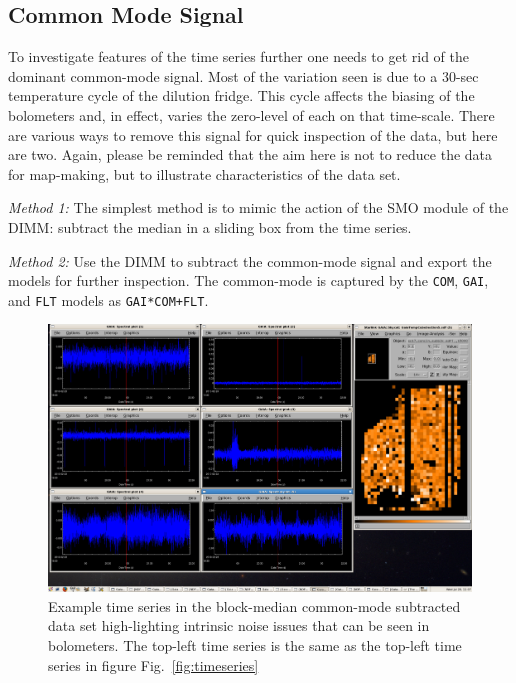 \documentclass[twoside,11pt]{article}
\newcommand{\xlabel}[1]{}
\renewcommand{\_}{\texttt{\symbol{95}}}
\begin{document}
\subsection{\xlabel{commonmode}Common Mode Signal}
\label{sec:commonmode}

To investigate features of the time series further one needs to get
rid of the dominant common-mode signal. Most of the variation seen is
due to a 30-sec temperature cycle of the dilution fridge. This cycle
affects the biasing of the bolometers and, in effect, varies the
zero-level of each on that time-scale. There are various ways to
remove this signal for quick inspection of the data, but here are two.
Again, please be reminded that the aim here is not to reduce the data
for map-making, but to illustrate characteristics of the data set.

\textsl{Method 1:} The simplest method is to mimic the action of the SMO module
of the DIMM: subtract the median in a sliding box from the time
series.

\textsl{Method 2:} Use the DIMM to subtract the common-mode signal and
export the models for further inspection. The common-mode is captured
by the \texttt{COM}, \texttt{GAI}, and \texttt{FLT} models as
\texttt{GAI*COM+FLT}.

\begin{figure}
\begin{center}
\includegraphics[width=1.0\linewidth]{sc19_timeseries2}
\caption{Example time series in the block-median common-mode
subtracted data set high-lighting intrinsic noise issues that can be
seen in bolometers. The top-left time series is the same as the
top-left time series in figure Fig.~\ref{fig:timeseries}}
\label{fig:timeseries2}
\end{center}
\end{figure}
\end{document}
